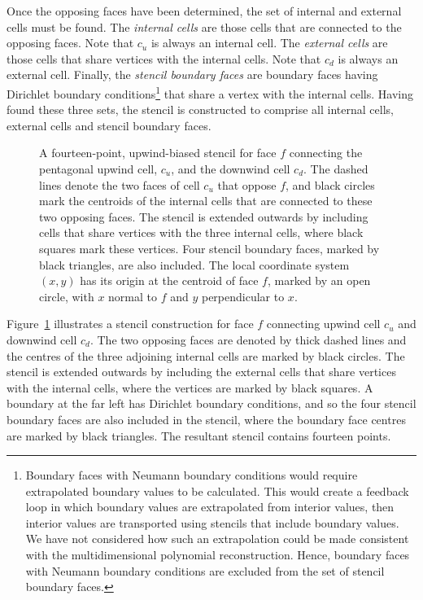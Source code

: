 Once the opposing faces have been determined, the set of internal and external cells must be found.  The \textit{internal cells} are those cells that are connected to the opposing faces.  Note that $c_u$ is always an internal cell.  The \textit{external cells} are those cells that share vertices with the internal cells.  Note that $c_d$ is always an external cell.  Finally, the \textit{stencil boundary faces} are boundary faces having Dirichlet boundary conditions\footnote{Boundary faces with Neumann boundary conditions would require extrapolated boundary values to be calculated.
This would create a feedback loop in which boundary values are extrapolated from interior values, then interior values are transported using stencils that include boundary values.  
We have not considered how such an extrapolation could be made consistent with the multidimensional polynomial reconstruction.
Hence, boundary faces with Neumann boundary conditions are excluded from the set of stencil boundary faces.} that share a vertex with the internal cells.
Having found these three sets, the stencil is constructed to comprise all internal cells, external cells and stencil boundary faces.

\begin{figure}
	\centering
	
	\caption{A fourteen-point, upwind-biased stencil for face $f$ connecting the pentagonal upwind cell, $c_u$, and the downwind cell $c_d$.  The dashed lines denote the two faces of cell $c_u$ that oppose $f$, and black circles mark the centroids of the internal cells that are connected to these two opposing faces.  The stencil is extended outwards by including cells that share vertices with the three internal cells, where black squares mark these vertices.  Four stencil boundary faces, marked by black triangles, are also included.
The local coordinate system $(x, y)$ has its origin at the centroid of face $f$, marked by an open circle, with $x$ normal to $f$ and $y$ perpendicular to $x$.}
	\label{fig:double-upwind-stencil}
\end{figure}

Figure~\ref{fig:double-upwind-stencil} illustrates a stencil construction for face $f$ connecting upwind cell $c_u$ and downwind cell $c_d$.  The two opposing faces are denoted by thick dashed lines and the centres of the three adjoining internal cells are marked by black circles.  The stencil is extended outwards by including the external cells that share vertices with the internal cells, where the vertices are marked by black squares.  A boundary at the far left has Dirichlet boundary conditions, and so the four stencil boundary faces are also included in the stencil, where the boundary face centres are marked by black triangles.  The resultant stencil contains fourteen points.

